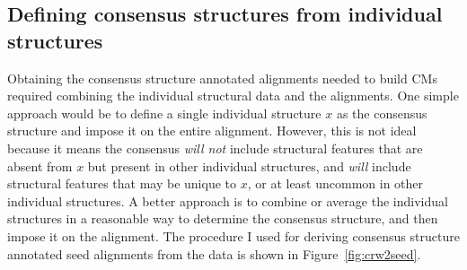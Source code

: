 \subsection{Defining consensus structures from individual structures}

Obtaining the consensus structure annotated alignments needed to build
CMs required combining the individual structural data and the
alignments. One simple approach would be to define a single individual
structure $x$ as the consensus structure and impose it on the entire
alignment. However, this is not ideal because it means the consensus
\emph{will not} include structural features that are absent from $x$
but present in other individual structures, and \emph{will} include
structural features that may be unique to $x$, or at least uncommon in
other individual structures. A better approach is to combine or
average the individual structures in a reasonable way to determine the
consensus structure, and then impose it on the alignment. The
procedure I used for deriving consensus structure annotated seed
alignments from the  data is shown in Figure~\ref{fig:crw2seed}.

